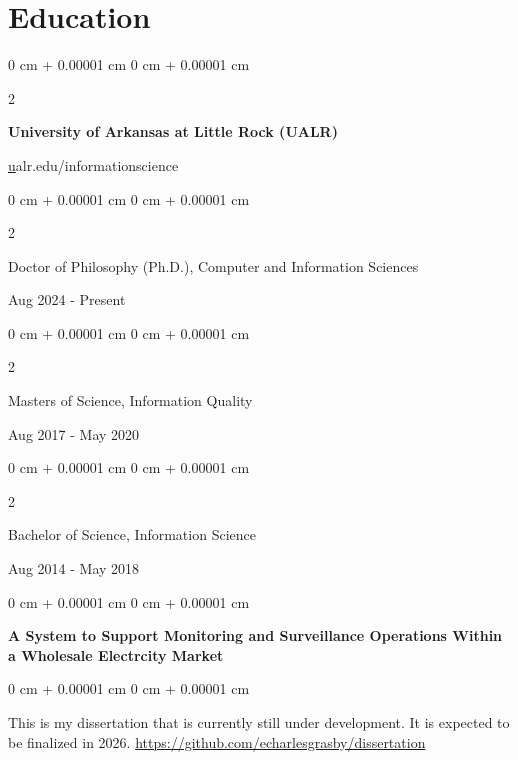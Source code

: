 \documentclass[10pt, letterpaper]{article}
\newenvironment{onecolentry}{
    \begin{adjustwidth}{
        0 cm + 0.00001 cm
    }{
        0 cm + 0.00001 cm
    }
}{
    \end{adjustwidth}
} %
\newenvironment{twocolentry}[2][]{
    \onecolentry
    \def\secondColumn{#2}
    \setcolumnwidth{\fill, 4.5 cm}
    \begin{paracol}{2}
}{
    \switchcolumn \raggedleft \secondColumn
    \end{paracol}
    \endonecolentry
} %
\begin{document}
        \section{Education}
        \begin{samepage}
        \begin{twocolentry}{
            \href{https://ualr.edu/informationscience} ualr.edu/informationscience 
        }
            \textbf{University of Arkansas at Little Rock (UALR)}
        \end{twocolentry}
             
        
        \vspace{0.25cm}

        \begin{twocolentry}{
            Aug 2024 - Present
        }
            Doctor of Philosophy (Ph.D.), Computer and Information Sciences
        \end{twocolentry}
        
        \begin{twocolentry}{
            Aug 2017 - May 2020
        }
            Masters of Science, Information Quality
        \end{twocolentry}

        \begin{twocolentry}{
            Aug 2014 - May 2018
        }
            Bachelor of Science, Information Science
        \end{twocolentry}
        
        \vspace{0.5 cm}
        
            \begin{onecolentry}
                \textbf{A System to Support Monitoring and Surveillance Operations Within a Wholesale Electrcity Market}
            \end{onecolentry}
%
            \vspace{0.10 cm}
            
        \begin{onecolentry}

                \vspace{0.10 cm}
                
         This is my dissertation that is currently still under development. It is expected to be finalized in 2026.
         \newline
         \url{https://github.com/echarlesgrasby/dissertation}
        \end{onecolentry}
    \end{samepage}
\end{document}
